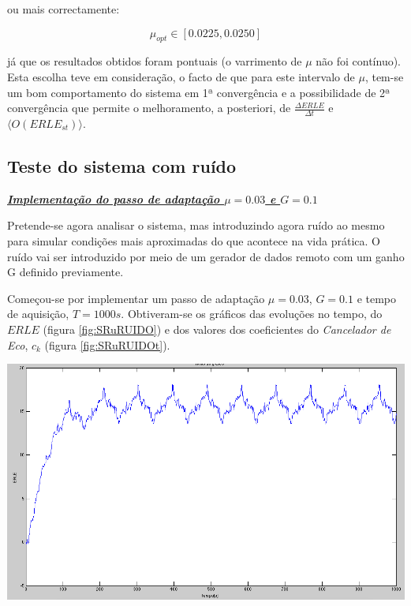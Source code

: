 \documentclass[a4paper,11pt]{report}
\begin{document}
ou mais correctamente: 

$$\mu_{opt}\in[0.0225,0.0250]$$

 já que os resultados obtidos foram pontuais (o varrimento de $\mu$ não foi contínuo). Esta escolha teve em consideração, o facto de que para este intervalo de $\mu$, tem-se um bom comportamento do sistema em 1ª convergência e a possibilidade de 2ª convergência que permite o melhoramento, a posteriori, de $\frac{\Delta ERLE}{\Delta t}$ e  $\langle O(ERLE_{st})\rangle$.







\subsection{Teste do sistema com ruído}

\large\underline{{\textit{\textbf{Implementação do passo de adaptação $\mu=0.03$ e $G=0.1$}}}}\\
\par
Pretende-se agora analisar o sistema, mas introduzindo agora ruído ao mesmo para simular condições mais aproximadas do que acontece na vida prática. O ruído vai ser introduzido por meio de um gerador de dados remoto com um ganho G definido previamente.

Começou-se por implementar um passo de adaptação $\mu=0.03$, $G=0.1$ e tempo de aquisição, $T=1000s$. Obtiveram-se os gráficos  das evoluções no tempo, do $ERLE$ (figura \ref{fig:SRuRUIDO}) e dos valores dos coeficientes do \textit{Cancelador de Eco}, $c_k$ (figura \ref{fig:SRuRUIDOt}).


\begin{center}
     \includegraphics[angle=0,width=1\textwidth]{ERLE_G0_1}
     \label{fig:SRuRUIDO}
     \end{center}
\end{document}
